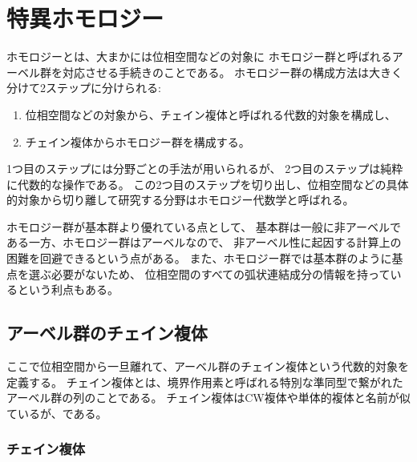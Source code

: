 \documentclass[report]{jlreq}
\def\assetspath{../}
\begin{document}
%
\chapter{特異ホモロジー}


ホモロジーとは、大まかには位相空間などの対象に
ホモロジー群と呼ばれるアーベル群を対応させる手続きのことである。
ホモロジー群の構成方法は大きく分けて2ステップに分けられる:
\begin{enumerate}
    \item 位相空間などの対象から、チェイン複体と呼ばれる代数的対象を構成し、
    \item チェイン複体からホモロジー群を構成する。
\end{enumerate}
1つ目のステップには分野ごとの手法が用いられるが、
2つ目のステップは純粋に代数的な操作である。
この2つ目のステップを切り出し、位相空間などの具体的対象から切り離して研究する分野はホモロジー代数学と呼ばれる。

ホモロジー群が基本群より優れている点として、
基本群は一般に非アーベルである一方、ホモロジー群はアーベルなので、
非アーベル性に起因する計算上の困難を回避できるという点がある。
また、ホモロジー群では基本群のように基点を選ぶ必要がないため、
位相空間のすべての弧状連結成分の情報を持っているという利点もある。


%
\section{アーベル群のチェイン複体}

ここで位相空間から一旦離れて、アーベル群のチェイン複体という代数的対象を定義する。
チェイン複体とは、境界作用素と呼ばれる特別な準同型で繋がれたアーベル群の列のことである。
チェイン複体はCW複体や単体的複体と名前が似ているが、である。

\subsection{チェイン複体}
\end{document}
